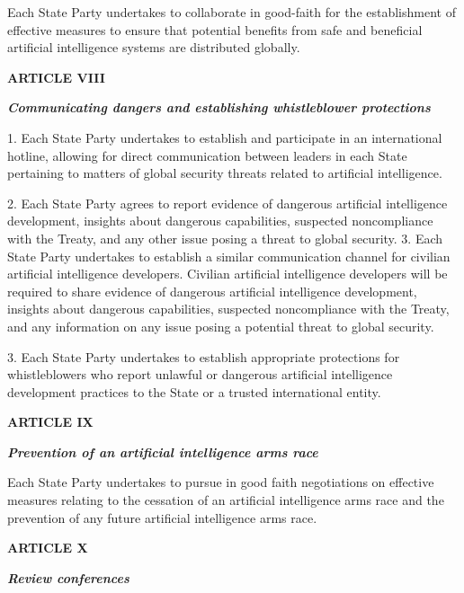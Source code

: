 \documentclass[12pt,a4paper]{article}
\begin{document}
Each State Party undertakes to collaborate in good-faith for the establishment of effective measures to ensure that potential benefits from safe and beneficial artificial intelligence systems are distributed globally. 

\begin{center}

\textbf{{ARTICLE VIII}}

\textit{\textbf{Communicating dangers and establishing whistleblower protections}} 
\end{center}
1. Each State Party undertakes to establish and participate in an international hotline, allowing for direct communication between leaders in each State pertaining to matters of global security threats related to artificial intelligence. 

2. Each State Party agrees to report evidence of dangerous artificial intelligence development, insights about dangerous capabilities, suspected noncompliance with the Treaty, and any other issue posing a threat to global security. 
3. Each State Party undertakes to establish a similar communication channel for civilian artificial intelligence developers. Civilian artificial intelligence developers will be required to share evidence of dangerous artificial intelligence development, insights about dangerous capabilities, suspected noncompliance with the Treaty, and any information on any issue posing a potential threat to global security.

3. Each State Party undertakes to establish appropriate protections for whistleblowers who report unlawful or dangerous artificial intelligence development practices to the State or a trusted international entity. 

 \begin{center}

\textbf{{ARTICLE IX}}

\textbf{\textit{Prevention of an artificial intelligence arms race}}
\end{center}

Each State Party undertakes to pursue in good faith negotiations on effective measures relating to the cessation of an artificial intelligence arms race and the prevention of any future artificial intelligence arms race. 

 \begin{center}

\textbf{{ARTICLE X}}

\textbf{\textit{Review conferences}}
\end{center}
\end{document}
